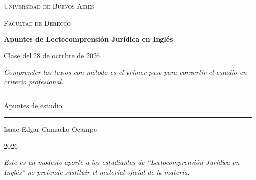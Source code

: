 \documentclass[12pt,oneside]{book}
\newcommand{\universidad}{Universidad de Buenos Aires}
\newcommand{\facultad}{Facultad de Derecho}
\newcommand{\titulo}{Apuntes de Lectocomprensión Jurídica en Inglés}
\newcommand{\autor}{Isaac Edgar Camacho Ocampo}
\newcommand{\anio}{2026}
\begin{document}
\begin{titlepage}

\thispagestyle{empty}

\begin{center}

\vspace*{1cm}

{\large \textsc{\universidad}}

\vspace{0.2cm}

{\large \textsc{\facultad}}

\vspace{3cm}

{\Huge \textbf{\titulo}}

\vspace{1cm}

{\LARGE Clase del 28 de octubre de 2026}

\vspace{0.8cm}

\textit{Comprender los textos con método es el primer paso para convertir el estudio en criterio profesional.}

\vspace{1.2cm}

\rule{0.70\textwidth}{0.5pt}

\vspace{0.5cm}

{\large Apuntes de estudio}

\vspace{0.5cm}

\rule{0.70\textwidth}{0.5pt}

\vfill

{\large \autor}

\vspace{0.3cm}

{\large \anio}

\end{center}

\vfill

\begin{flushleft}
\textit{Este es un modesto aporte a los estudiantes de ``Lectocomprensión Jurídica en Inglés'' no pretende sustituir el material oficial de la materia.}
\end{flushleft}

\end{titlepage}
\end{document}
